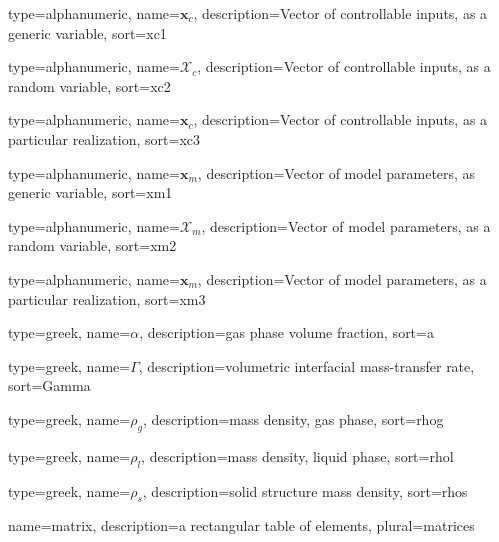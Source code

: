 {
  type=alphanumeric,
	name={\ensuremath{\bm{x}_c}},
	description={Vector of controllable inputs, as a generic variable},
	sort={xc1}
}

{
  type=alphanumeric,
	name={\ensuremath{\bm{\mathcal{X}}_c}},
	description={Vector of controllable inputs, as a random variable},
	sort={xc2}
}

{
  type=alphanumeric,
	name={\ensuremath{\mathbf{x}_c}},
	description={Vector of controllable inputs, as a particular realization},
	sort={xc3}
}

{
  type=alphanumeric,
	name={\ensuremath{\bm{x}_m}},
	description={Vector of model parameters, as generic variable},
	sort={xm1}
}

{
  type=alphanumeric,
	name={\ensuremath{\bm{\mathcal{X}}_m}},
	description={Vector of model parameters, as a random variable},
	sort={xm2}
}

{
  type=alphanumeric,
	name={\ensuremath{\mathbf{x}_m}},
	description={Vector of model parameters, as a particular realization},
	sort={xm3}
}


{
  type=greek,
	name={\ensuremath{\alpha}},
	description={gas phase volume fraction},
	sort={a}
}	

{
  type=greek,
	name={\ensuremath{\Gamma}},
	description={volumetric interfacial mass-transfer rate},
	sort={Gamma}
}

{
  type=greek,
	name={\ensuremath{\rho_g}},
	description={mass density, gas phase},
	sort={rhog}
}

{
  type=greek,
	name={\ensuremath{\rho_l}},
	description={mass density, liquid phase},
	sort={rhol}
}

{
  type=greek,
	name={\ensuremath{\rho_{s}}},
	description={solid structure mass density},
	sort={rhos}
}

{name={matrix},%
    description={a rectangular table of elements},%
    plural={matrices}%
}


